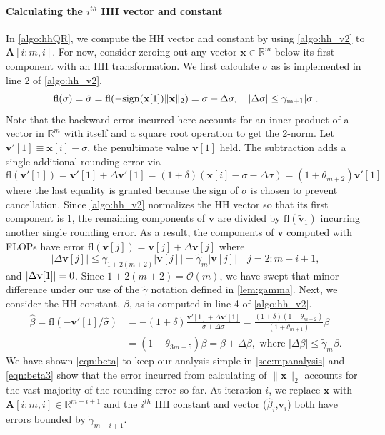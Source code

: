\documentclass[review,onefignum,onetabnum]{siamart190516}
\newcommand{\R}{\mathbb{R}}
\newcommand{\dd}{\delta}
\newcommand{\tth}{\theta}
\newcommand{\bb}[1]{\mathbf{#1}}
\newcommand{\fl}{\mathrm{fl}}
\newcommand{\cO}{\mathcal{O}}
\begin{document}
\paragraph{Calculating the $i^{th}$ HH vector and constant} 
In \cref{algo:hhQR}, we compute the HH vector and constant by using \cref{algo:hh_v2} to $\bb{A}[i:m,i]$.
For now, consider zeroing out any vector $\bb{x}\in\R^m$ below its first component with an HH transformation.
We first calculate $\sigma$ as is implemented in line 2 of \cref{algo:hh_v2}.
\begin{equation}
\label{eqn:sigma}
\fl(\sigma) = \hat{\sigma} = \rm{fl}(-\rm{sign}(\bb{x}[1])\|\bb{x}\|_2) = \sigma + \Delta \sigma,\quad |\Delta\sigma| \leq \gamma_{m+1}|\sigma|.
\end{equation}
Note that the backward error incurred here accounts for an inner product of a vector in $\R^{m}$ with itself and a square root operation to get the 2-norm. 
Let $\bb{v}'[1]\equiv \bb{x}[i]-\sigma$, the penultimate value $\bb{v}[1]$ held. 
The subtraction adds a single additional rounding error via
\begin{equation}
	\fl(\bb{v}'[1]) =\bb{v}'[1] + \Delta \bb{v}'[1] = (1+\dd) (\bb{x}[i]-\sigma-\Delta\sigma)= (1+\tth_{m+2})\bb{v}'[1]
\end{equation}
where the last equality is granted because the sign of $\sigma$ is chosen to prevent cancellation.
Since \cref{algo:hh_v2} normalizes the HH vector so that its first component is $1$, the remaining components of $\bb{v}$ are divided by $\fl(\tilde{\bb{v}}_1)$ incurring another single rounding error.
As a result, the components of $\bb{v}$ computed with FLOPs have error $\fl(\bb{v}[j])	= \bb{v}[j] + \Delta \bb{v}[j]$ where 
\begin{equation}
|\Delta \bb{v}[j]|\leq \gamma_{1+2(m+2)}|\bb{v}[j]| =\tilde{\gamma}_{m}|\bb{v}[j]|\quad j=2:m-i+1,\label{eqn:vbound}
\end{equation}
and $|\Delta {\bf v}[1]| = 0$.
Since $1+2(m+2) = \cO(m)$, we have swept that minor difference under our use of the $\tilde{\gamma}$ notation defined in \cref{lem:gamma}.
Next, we consider the HH constant, $\beta$, as is computed in line 4 of \cref{algo:hh_v2}.
\begin{align}
\hat{\beta} = \fl\left(-\bb{v}'[1]/\hat{\sigma}\right) &=-(1+\dd)\frac{\bb{v}'[1]+\Delta \bb{v}'[1]}{\sigma + \Delta\sigma} = \frac{(1+\dd)(1+\tth_{m+2})}{(1+\tth_{m+1})}\beta \label{eqn:beta}\\
&= (1+\tth_{3m+5})\beta= \beta + \Delta \beta,\text{ where } |\Delta\beta| \leq \tilde{\gamma}_{m} \beta\label{eqn:beta3}.
\end{align}
We have shown \cref{eqn:beta} to keep our analysis simple in \cref{sec:mpanalysis} and \cref{eqn:beta3} show that the error incurred from calculating of $\|\bb{x}\|_2$ accounts for the vast majority of the rounding error so far.
At iteration $i$, we replace $\bb{x}$ with $\bb{A}[i:m,i]\in\R^{m-i+1}$ and the $i^{th}$ HH constant and vector ($\hat{\beta}_i$,$\bb{v}_i$) both have errors bounded by $\tilde{\gamma}_{m-i+1}$.
\end{document}
